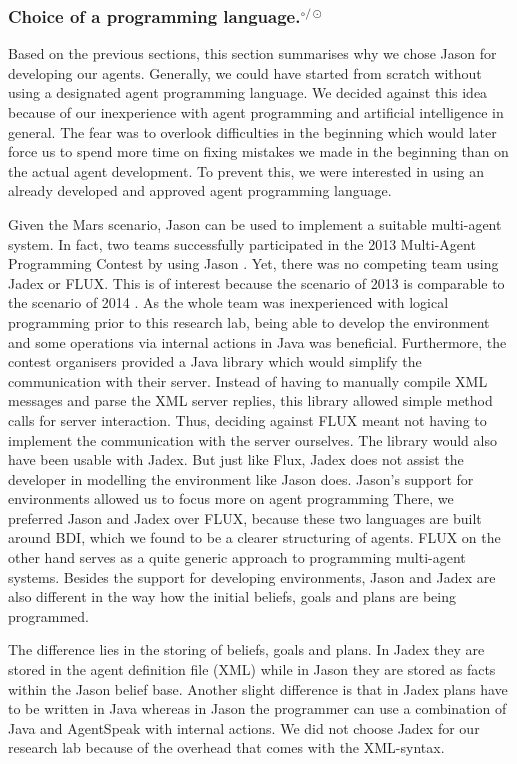 \subsubsection[Choice of a programming language.]{Choice of a programming language.$^{\circ/\odot}$}\label{fun:apl_choice}
Based on the previous sections, this section summarises why we chose Jason for developing our agents.
Generally, we could have started from scratch without using a designated agent programming language.
We decided against this idea because of our inexperience with agent programming and artificial intelligence in general.
The fear was to overlook difficulties in the beginning which would later force us to spend more time on fixing mistakes we made in the beginning than on the actual agent development.
To prevent this, we were interested in using an already developed and approved agent programming language.

Given the Mars scenario, Jason can be used to implement a suitable multi-agent system.
In fact, two teams successfully participated in the 2013 Multi-Agent Programming Contest by using Jason \cite{ahlbrecht_multi_2013}. %
Yet, there was no competing team using Jadex or FLUX.
This is of interest because the scenario of 2013 is comparable to the scenario of 2014 \cite{ahlbrecht_mapc_2014}. %
As the whole team was inexperienced with logical programming prior to this research lab, being able to develop the environment and some operations via internal actions in Java was beneficial.
Furthermore, the contest organisers provided a Java library which would simplify the communication with their server.
Instead of having to manually compile XML messages and parse the XML server replies, this library allowed simple method calls for server interaction.
Thus, deciding against FLUX meant not having to implement the communication with the server ourselves.
The library would also have been usable with Jadex.
But just like Flux, Jadex does not assist the developer in modelling the environment like Jason does.
Jason's support for environments allowed us to focus more on agent programming
There, we preferred Jason and Jadex over FLUX, because these two languages are built around BDI, which we found to be a clearer structuring of agents.
FLUX on the other hand serves as a quite generic approach to programming multi-agent systems.
Besides the support for developing environments, Jason and Jadex are also different in the way how the initial beliefs, goals and plans are being programmed.

The difference lies in the storing of beliefs, goals and plans.
In Jadex they are stored in the agent definition file (XML) while in Jason they are stored as facts within the Jason belief base.
Another slight difference is that in Jadex plans have to be written in Java whereas in Jason the programmer can use a combination of Java and AgentSpeak with internal actions.
We did not choose Jadex for our research lab because of the overhead that comes with the XML-syntax.
